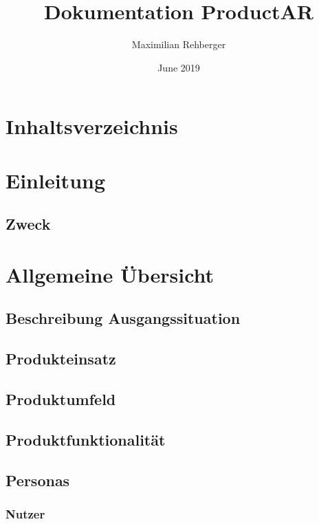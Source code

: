 \documentclass{scrartcl}
\title{Dokumentation ProductAR}
\author{Maximilian Rehberger}
\date{June 2019}
\begin{document}
\maketitle

\newpage


\renewcommand*\contentsname{}
\section{Inhaltsverzeichnis}
\tableofcontents{}


\newpage

\section{Einleitung}

\subsection{Zweck}


\newpage

\section{Allgemeine Übersicht}

\subsection{Beschreibung Ausgangssituation}

\subsection{Produkteinsatz}

\subsection{Produktumfeld}

\subsection{Produktfunktionalität}

\subsection{Personas}

\subsubsection{Nutzer}
\end{document}
